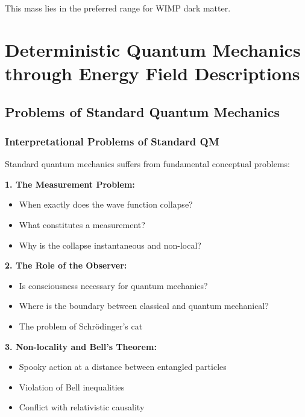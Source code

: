 \documentclass[12pt,a4paper]{report}
\begin{document}
	This mass lies in the preferred range for WIMP dark matter.
	\chapter{Deterministic Quantum Mechanics through Energy Field Descriptions}\label{chap:deterministic_qm}
	
	\section{Problems of Standard Quantum Mechanics}\label{sec:qm_problems}
	
	\subsection{Interpretational Problems of Standard QM}\label{subsec:interpretational_problems}
	
	Standard quantum mechanics suffers from fundamental conceptual problems:
	
	\textbf{1. The Measurement Problem:}
	\begin{itemize}
		\item When exactly does the wave function collapse?
		\item What constitutes a measurement?
		\item Why is the collapse instantaneous and non-local?
	\end{itemize}
	
	\textbf{2. The Role of the Observer:}
	\begin{itemize}
		\item Is consciousness necessary for quantum mechanics?
		\item Where is the boundary between classical and quantum mechanical?
		\item The problem of Schrödinger's cat
	\end{itemize}
	
	\textbf{3. Non-locality and Bell's Theorem:}
	\begin{itemize}
		\item Spooky action at a distance between entangled particles
		\item Violation of Bell inequalities
		\item Conflict with relativistic causality
	\end{itemize}
	
\end{document}
